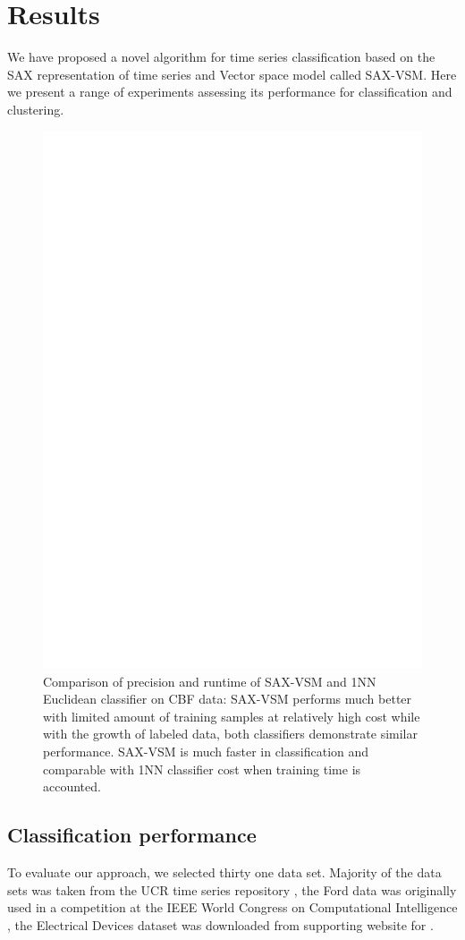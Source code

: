 \documentclass{llncs}
\begin{document}
\section{Results}
We have proposed a novel algorithm for time series classification based on the SAX
representation of time series and Vector space model called SAX-VSM. Here we present a range of
experiments assessing its performance for classification and clustering.

\begin{figure}[t]
   \centering
   \includegraphics[width=115mm]{figures/precision-runtime.ps}
   \caption{Comparison of precision and runtime of SAX-VSM and 1NN Euclidean classifier on
CBF data: SAX-VSM performs much better with limited amount of training samples at relatively high
cost while with the growth of labeled data, both classifiers demonstrate similar performance.
SAX-VSM is much faster in classification and comparable with 1NN classifier cost when training time
is accounted.}
   \label{fig:precision-runtime}
\end{figure}

\subsection{Classification performance}
To evaluate our approach, we selected thirty one data set. Majority of the data sets was taken 
from the UCR time series repository \cite{ucr}, the Ford data was originally used in a competition
at the IEEE World Congress on Computational Intelligence \cite{ford}, the Electrical Devices
dataset was downloaded from supporting website for \cite{bagnal}.
\end{document}
